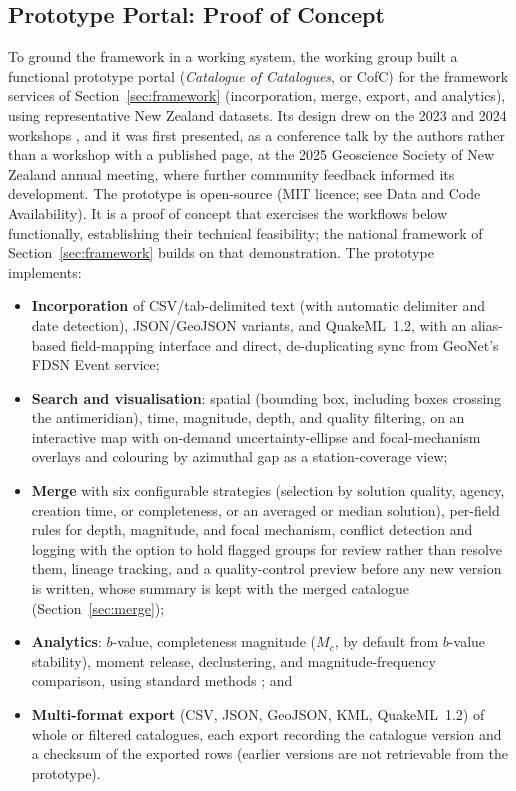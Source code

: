 \documentclass[11pt]{article}
\begin{document}
\subsection{Prototype Portal: Proof of Concept}
\label{sec:prototype}
To ground the framework in a working system, the working group built a functional prototype portal (\emph{Catalogue of Catalogues}, or CofC) for the framework services of Section~\ref{sec:framework} (incorporation, merge, export, and analytics), using representative New Zealand datasets. Its design drew on the 2023 and 2024 workshops \citep{GSNZWorkshop2023, GSNZWorkshop2024}, and it was first presented, as a conference talk by the authors rather than a workshop with a published page, at the 2025 Geoscience Society of New Zealand annual meeting, where further community feedback informed its development. The prototype is open-source (MIT licence; see Data and Code Availability). It is a proof of concept that exercises the workflows below functionally, establishing their technical feasibility; the national framework of Section~\ref{sec:framework} builds on that demonstration. The prototype implements:
\begin{itemize}
\setlength{\itemsep}{1pt}
\item \textbf{Incorporation} of CSV/tab-delimited text (with automatic delimiter and date detection), JSON/GeoJSON variants, and QuakeML~1.2, with an alias-based field-mapping interface and direct, de-duplicating sync from GeoNet's FDSN Event service;
\item \textbf{Search and visualisation}: spatial (bounding box, including boxes crossing the antimeridian), time, magnitude, depth, and quality filtering, on an interactive map with on-demand uncertainty-ellipse and focal-mechanism overlays and colouring by azimuthal gap as a station-coverage view;
\item \textbf{Merge} with six configurable strategies (selection by solution quality, agency, creation time, or completeness, or an averaged or median solution), per-field rules for depth, magnitude, and focal mechanism, conflict detection and logging with the option to hold flagged groups for review rather than resolve them, lineage tracking, and a quality-control preview before any new version is written, whose summary is kept with the merged catalogue (Section~\ref{sec:merge});
\item \textbf{Analytics}: $b$-value, completeness magnitude ($M_c$, by default from $b$-value stability), moment release, declustering, and magnitude-frequency comparison, using standard methods \citep{Aki1965,Wiemer2000,Woessner2005,GardnerKnopoff1974}; and
\item \textbf{Multi-format export} (CSV, JSON, GeoJSON, KML, QuakeML~1.2) of whole or filtered catalogues, each export recording the catalogue version and a checksum of the exported rows (earlier versions are not retrievable from the prototype).
\end{itemize}
\end{document}
